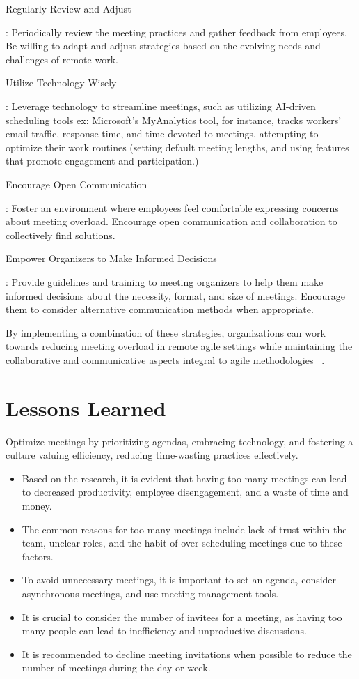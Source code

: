 \begin{enumerate}
{\bfseries \item  Regularly Review and Adjust}:
Periodically review the meeting practices and gather feedback from employees. Be willing to adapt and adjust strategies based on the evolving needs and challenges of remote work.
{\bfseries \item  Utilize Technology Wisely}:
Leverage technology to streamline meetings, such as utilizing AI-driven scheduling tools ex: Microsoft's MyAnalytics tool, for instance, tracks workers' email traffic, response time, and time devoted to meetings, attempting to optimize their work routines (setting default meeting lengths, and using features that promote engagement and participation.) ~\cite{08}
{\bfseries \item  Encourage Open Communication}:
Foster an environment where employees feel comfortable expressing concerns about meeting overload. Encourage open communication and collaboration to collectively find solutions.
{\bfseries \item  Empower Organizers to Make Informed Decisions}:
Provide guidelines and training to meeting organizers to help them make informed decisions about the necessity, format, and size of meetings. Encourage them to consider alternative communication methods when appropriate.
\end{enumerate}
By implementing a combination of these strategies, organizations can work towards reducing meeting overload in remote agile settings while maintaining the collaborative and communicative aspects integral to agile methodologies ~\cite{07}.
\section{Lessons Learned}
Optimize meetings by prioritizing agendas, embracing technology, and fostering a culture valuing efficiency, reducing time-wasting practices effectively.
\begin{itemize}
\item Based on the research, it is evident that having too many meetings can lead to decreased productivity, employee disengagement, and a waste of time and money.
\item The common reasons for too many meetings include lack of trust within the team, unclear roles, and the habit of over-scheduling meetings due to these factors.
\item To avoid unnecessary meetings, it is important to set an agenda, consider asynchronous meetings, and use meeting management tools.
\item It is crucial to consider the number of invitees for a meeting, as having too many people can lead to inefficiency and unproductive discussions.
\item It is recommended to decline meeting invitations when possible to reduce the number of meetings during the day or week.
\end{itemize}
